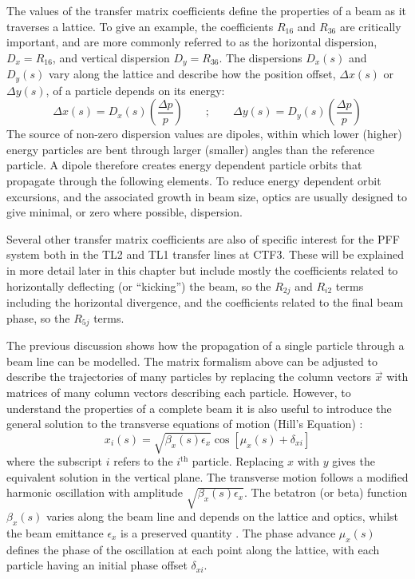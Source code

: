 The values of the transfer matrix coefficients define the properties of a beam as it traverses a lattice. To give an example, the coefficients \(R_{16}\) and \(R_{36}\) are critically important, and are more commonly referred to as the horizontal dispersion, \(D_x = R_{16}\), and vertical dispersion \(D_y = R_{36}\). The dispersions \(D_x(s)\) and \(D_y(s)\) vary along the lattice and describe how the position offset, \(\Delta x(s)\) or \(\Delta y(s)\), of a particle depends on its energy:
\begin{equation}
\Delta x(s) = D_x(s)\left(\frac{\Delta p}{p}\right) 
\qquad\mathrm{;}\qquad
\Delta y(s) = D_y(s)\left(\frac{\Delta p}{p}\right)
\end{equation}
The source of non-zero dispersion values are dipoles, within which lower (higher) energy particles are bent through larger (smaller) angles than the reference particle. A dipole therefore creates energy dependent particle orbits that propagate through the following elements. To reduce energy dependent orbit excursions, and the associated growth in beam size, optics are usually designed to give minimal, or zero where possible, dispersion. 

Several other transfer matrix coefficients are also of specific interest for the PFF system both in the TL2 and TL1 transfer lines at CTF3. These will be explained in more detail later in this chapter but include mostly the coefficients related to horizontally deflecting (or ``kicking'') the beam, so the \(R_{2j}\) and \(R_{i2}\) terms including the horizontal divergence, and the coefficients related to the final beam phase, so the \(R_{5j}\) terms.  

The previous discussion shows how the propagation of a single particle through a beam line can be modelled. The matrix formalism above can be adjusted to describe the trajectories of many particles by replacing the column vectors \(\vec{x}\) with matrices of many column vectors describing each particle. However, to understand the properties of a complete beam it is also useful to introduce the general solution to the transverse equations of motion (Hill's Equation) \cite{lee}:
\begin{equation}
x_i(s) = \sqrt{\beta_x(s)\epsilon_x}\cos[\mu_x(s) + \delta_{xi}]
\end{equation}
where the subscript \(i\) refers to the \(i^\mathrm{th}\) particle. Replacing \(x\) with \(y\) gives the equivalent solution in the vertical plane. The transverse motion follows a modified harmonic oscillation with amplitude \(\sqrt{\beta_x(s)\epsilon_x}\). The betatron (or beta) function \(\beta_x(s)\) varies along the beam line and depends on the lattice and optics, whilst the beam emittance \(\epsilon_x\) is a preserved quantity \cite{wolski}. The phase advance \(\mu_x(s)\) defines the phase of the oscillation at each point along the lattice, with each particle having an initial phase offset \(\delta_{xi}\). 

